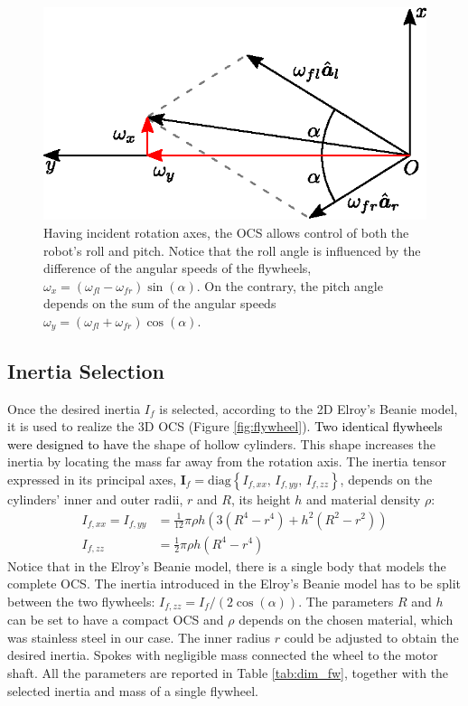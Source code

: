 \documentclass[sensors,article,accept,pdftex,moreauthors]{Definitions/mdpi}
\newcommand{\MF}[1]{\textcolor{black}{#1}}
\begin{document}
\begin{figure}[H]%
	 
	\includegraphics[width=.7\linewidth]{figures/sum_diff_mod.eps}
	\caption{Having incident rotation axes, the OCS allows control of both the robot's roll and pitch. Notice that the roll angle is influenced by the difference of the angular speeds of the flywheels, $\omega_x = \left(\omega_{fl} - \omega_{fr}\right)\sin(\alpha)$. On the contrary, the pitch angle depends on the sum of the angular speeds $\omega_y = \left(\omega_{fl} +  \omega_{fr}\right)\cos(\alpha)$.}
	\label{fig:sum-diff}
\end{figure}

\subsection{Inertia Selection}
Once the desired inertia $I_f$ is selected, according to the 2D Elroy's Beanie model, it is used to realize the 3D OCS (Figure \ref{fig:flywheel}). 
\MF{Two identical flywheels were designed to have} the shape of hollow cylinders. This shape increases the inertia by locating the mass far away from the rotation axis. The inertia tensor expressed in its principal axes, \linebreak  $\bm{I}_f = \mathrm{diag}\left\{ I_{f, xx}, \, I_{f, yy}, \, I_{f, zz}  \right\}$, depends on the cylinders' inner and outer radii, $r$ and $R$, its height $h$ and material density $\rho$:
\begin{equation}
\begin{split}
I_{f, xx} = I_{f, yy} &= \frac{1}{12}\pi \rho h \left(3\left(R^4 - r^4\right) + h^2\left(R^2 - r^2\right)\right) \\
I_{f, zz} &= \frac{1}{2}\pi \rho h \left(R^4 - r^4\right)
\end{split}
\end{equation}
Notice that in the Elroy's Beanie model, there is a single body that models the complete OCS. The inertia introduced in the Elroy's Beanie model has to be split between the two flywheels: $I_{f, zz} = I_f/\left(2\cos(\alpha)\right)$. 
The parameters $R$ and $h$ can be set to have a compact OCS and $\rho$ depends on the chosen material, which was stainless steel in our case. The inner radius $r$ could be adjusted to obtain the desired inertia. Spokes with negligible mass connected the wheel to the motor shaft. All the parameters are reported in Table \ref{tab:dim_fw}, together with the selected inertia and mass of a single flywheel.
\end{document}
